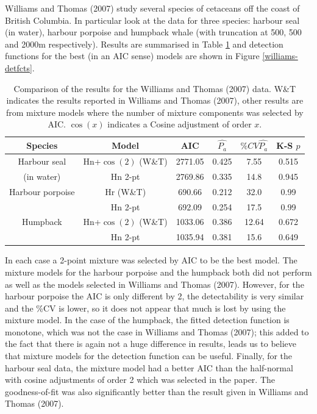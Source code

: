 \documentclass[useAMS,referee, usegraphicx]{biom}
\begin{document}
Williams and Thomas (2007) study several species of cetaceans off the coast of British Columbia. In particular look at the data for three species: harbour seal (in water), harbour porpoise and humpback whale (with truncation at 500, 500 and 2000m respectively). Results are summarised in Table \ref{williams-table} and detection functions for the best (in an AIC sense) models are shown in Figure \ref{williams-detfcts}.

\begin{table}
\caption{Comparison of the results for the Williams and Thomas (2007) data. W\&T indicates the results reported in Williams and Thomas (2007), other results are from mixture models where the number of mixture components was selected by AIC. $\cos(x)$ indicates a Cosine adjustment of order $x$.}
\centering
\begin{tabular}{c c c c c c}
\hline \hline
Species & Model & AIC & $\hat{P_a}$ & $\% CV \hat{P_a}$ & K-S $p$\\
\hline
Harbour seal & Hn+$\cos(2)$ (W\&T) & 2771.05 & 0.425 & 7.55 & 0.515\\
(in water) & Hn 2-pt  & 2769.86 & 0.335 & 14.8 & 0.945\\
Harbour porpoise & Hr (W\&T) & 690.66 & 0.212 & 32.0 & 0.99\\
 & Hn 2-pt & 692.09 & 0.254 & 17.5 & 0.99\\
Humpback & Hn+$\cos(2)$ (W\&T) & 1033.06 & 0.386 & 12.64 & 0.672 \\
 & Hn 2-pt & 1035.94 & 0.381 & 15.6 & 0.649 \\
\hline
\end{tabular}
\label{williams-table}
\end{table}

In each case a 2-point mixture was selected by AIC to be the best model. The mixture models for the harbour porpoise and the humpback both did not perform as well as the models selected in Williams and Thomas (2007). However, for the harbour porpoise the AIC is only different by 2, the detectability is very similar and the \%CV is lower, so it does not appear that much is lost by using the mixture model. In the case of the humpback, the fitted detection function is monotone, which was not the case in Williams and Thomas (2007); this added to the fact that there is again not a huge difference in results, leads us to believe that mixture models for the detection function can be useful. Finally, for the harbour seal data, the mixture model had a better AIC than the half-normal with cosine adjustments of order 2 which was selected in the paper. The goodness-of-fit was also significantly better than the result given in Williams and Thomas (2007).
\end{document}
